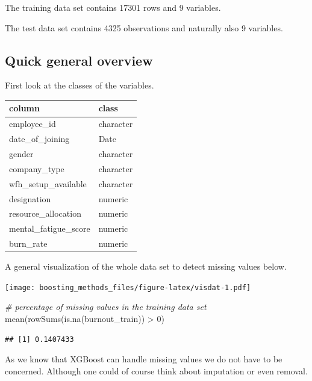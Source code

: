 \documentclass[
]{book}
\newenvironment{Shaded}{\begin{snugshade}}{\end{snugshade}}
\newcommand{\CommentTok}[1]{\textcolor[rgb]{0.56,0.35,0.01}{\textit{#1}}}
\newcommand{\DecValTok}[1]{\textcolor[rgb]{0.00,0.00,0.81}{#1}}
\newcommand{\FunctionTok}[1]{\textcolor[rgb]{0.00,0.00,0.00}{#1}}
\newcommand{\NormalTok}[1]{#1}
\newcommand{\SpecialCharTok}[1]{\textcolor[rgb]{0.00,0.00,0.00}{#1}}
\begin{document}
The training data set contains 17301 rows and 9 variables.

The test data set contains 4325 observations and naturally also 9 variables.

\hypertarget{quick-general-overview}{%
\subsection{Quick general overview}\label{quick-general-overview}}

First look at the classes of the variables.

\begin{tabular}{l|l}
\hline
column & class\\
\hline
employee\_id & character\\
\hline
date\_of\_joining & Date\\
\hline
gender & character\\
\hline
company\_type & character\\
\hline
wfh\_setup\_available & character\\
\hline
designation & numeric\\
\hline
resource\_allocation & numeric\\
\hline
mental\_fatigue\_score & numeric\\
\hline
burn\_rate & numeric\\
\hline
\end{tabular}

A general visualization of the whole data set to detect missing values below.

\texttt{[image: boosting\_methods\_files/figure-latex/visdat-1.pdf]}

\begin{Shaded}
\begin{Highlighting}[]
\CommentTok{\# percentage of missing values in the training data set}
\FunctionTok{mean}\NormalTok{(}\FunctionTok{rowSums}\NormalTok{(}\FunctionTok{is.na}\NormalTok{(burnout\_train)) }\SpecialCharTok{\textgreater{}} \DecValTok{0}\NormalTok{)}
\end{Highlighting}
\end{Shaded}

\begin{verbatim}
## [1] 0.1407433
\end{verbatim}

As we know that XGBoost can handle missing values we do not have to be concerned. Although one could of course think about imputation or even removal.
\end{document}
